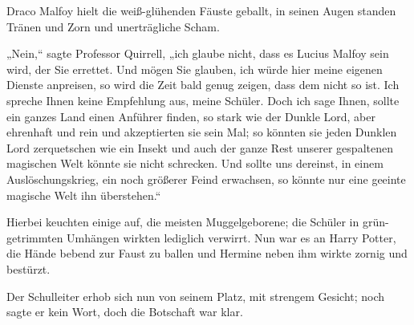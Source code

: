 Draco Malfoy hielt die weiß-glühenden Fäuste geballt, in seinen Augen standen Tränen und Zorn und unerträgliche Scham.

„Nein,“ sagte Professor Quirrell, „ich glaube nicht, dass es Lucius Malfoy sein wird, der Sie errettet. Und mögen Sie glauben, ich würde hier meine eigenen Dienste anpreisen, so wird die Zeit bald genug zeigen, dass dem nicht so ist. Ich spreche Ihnen keine Empfehlung aus, meine Schüler. Doch ich sage Ihnen, sollte ein ganzes Land einen Anführer finden, so stark wie der Dunkle Lord, aber ehrenhaft und rein und akzeptierten sie sein Mal; so könnten sie jeden Dunklen Lord zerquetschen wie ein Insekt und auch der ganze Rest unserer gespaltenen magischen Welt könnte sie nicht schrecken. Und sollte uns dereinst, in einem Auslöschungskrieg, ein noch größerer Feind erwachsen, so könnte nur eine geeinte magische Welt ihn überstehen.“

Hierbei keuchten einige auf, die meisten Muggelgeborene; die Schüler in grün-getrimmten Umhängen wirkten lediglich verwirrt. Nun war es an Harry Potter, die Hände bebend zur Faust zu ballen und Hermine neben ihm wirkte zornig und bestürzt.

Der Schulleiter erhob sich nun von seinem Platz, mit strengem Gesicht; noch sagte er kein Wort, doch die Botschaft war klar.

